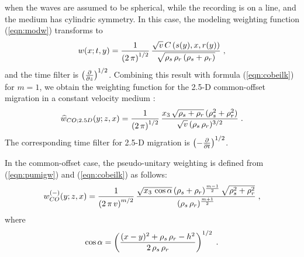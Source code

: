when the waves are assumed to be spherical, while the recording is on a line,
and the medium has cylindric symmetry. In this case, the modeling weighting
function (\ref{eqn:modw}) transforms to
\cite[]{GPR31.02.02930333,GPR34.05.06860703}
\begin{equation}
w(x;t,y)  =  {1\over{\left(2\,\pi\right)^{1/2}}} \,
{\sqrt{v}\,{C\left(s(y),x,r(y)\right)} 
\over {\sqrt{\rho_s\,\rho_r\,(\rho_s + \rho_r)}}}\;,
\end{equation}
and the time filter is $\left({\partial \over {\partial
z}}\right)^{1/2}$. Combining this result with formula (\ref{eqn:cobeilk})
for $m=1$, we obtain the weighting function for the 2.5-D
common-offset migration in a constant velocity medium
\cite[]{GEO52.06.07450754}:
\begin{equation}
\widehat{w}_{CO;2.5D}(y;z,x)  =  {1\over{\left(2\,\pi\right)^{1/2}}} \,
{{x_3\,\sqrt{\rho_s + \rho_r}\,(\rho_s^2 + \rho_r^2)} \over 
{\sqrt{v}\,(\rho_s\,\rho_r)^{3/2}}}\;.
\end{equation}
The corresponding time filter for 2.5-D migration is $\left(-
{\partial \over {\partial t}}\right)^{1/2}$.
\par

In the
common-offset case, the pseudo-unitary weighting is defined from
(\ref{eqn:pumigw}) and (\ref{eqn:cobeilk}) as follows:
\begin{equation}
w^{(-)}_{CO}(y;z,x)  =  {1\over{\left(2\,\pi\,v\right)^{m/2}}} \,
{{\sqrt{x_3\,\cos{\alpha}}\,(\rho_s + \rho_r)^{{m-1} \over 2}\,
\sqrt{\rho_s^2 + \rho_r^2}} \over 
{(\rho_s\,\rho_r)^{{m+1} \over 2}}}\;,
\end{equation}
where
\begin{equation}
\cos{\alpha} = \left({
{(x - y)^2 + \rho_s\,\rho_r - h^2} \over {2\,\rho_s\,\rho_r}}
\right)^{1/2}\;.
\end{equation}

